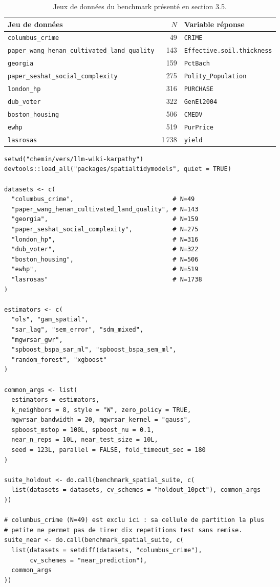 \documentclass[11pt,a4paper]{article}
\begin{document}
\begin{table}[htbp]
\centering
\small
\begin{tabular}{lrl}
\toprule
Jeu de données & $N$ & Variable réponse \\
\midrule
\texttt{columbus\_crime} & 49 & \texttt{CRIME} \\
\texttt{paper\_wang\_henan\_cultivated\_land\_quality} & 143 & \texttt{Effective.soil.thickness} \\
\texttt{georgia} & 159 & \texttt{PctBach} \\
\texttt{paper\_seshat\_social\_complexity} & 275 & \texttt{Polity\_Population} \\
\texttt{london\_hp} & 316 & \texttt{PURCHASE} \\
\texttt{dub\_voter} & 322 & \texttt{GenEl2004} \\
\texttt{boston\_housing} & 506 & \texttt{CMEDV} \\
\texttt{ewhp} & 519 & \texttt{PurPrice} \\
\texttt{lasrosas} & 1\,738 & \texttt{yield} \\
\bottomrule
\end{tabular}
\caption{Jeux de données du benchmark présenté en section 3.5.}
\label{tab:jeux-benchmark}
\end{table}

{\footnotesize
\begin{verbatim}
setwd("chemin/vers/llm-wiki-karpathy")
devtools::load_all("packages/spatialtidymodels", quiet = TRUE)

datasets <- c(
  "columbus_crime",                           # N=49
  "paper_wang_henan_cultivated_land_quality", # N=143
  "georgia",                                  # N=159
  "paper_seshat_social_complexity",           # N=275
  "london_hp",                                # N=316
  "dub_voter",                                # N=322
  "boston_housing",                           # N=506
  "ewhp",                                     # N=519
  "lasrosas"                                  # N=1738
)

estimators <- c(
  "ols", "gam_spatial",
  "sar_lag", "sem_error", "sdm_mixed",
  "mgwrsar_gwr",
  "spboost_bspa_sar_ml", "spboost_bspa_sem_ml",
  "random_forest", "xgboost"
)

common_args <- list(
  estimators = estimators,
  k_neighbors = 8, style = "W", zero_policy = TRUE,
  mgwrsar_bandwidth = 20, mgwrsar_kernel = "gauss",
  spboost_mstop = 100L, spboost_nu = 0.1,
  near_n_reps = 10L, near_test_size = 10L,
  seed = 123L, parallel = FALSE, fold_timeout_sec = 180
)

suite_holdout <- do.call(benchmark_spatial_suite, c(
  list(datasets = datasets, cv_schemes = "holdout_10pct"), common_args
))

# columbus_crime (N=49) est exclu ici : sa cellule de partition la plus
# petite ne permet pas de tirer dix repetitions test sans remise.
suite_near <- do.call(benchmark_spatial_suite, c(
  list(datasets = setdiff(datasets, "columbus_crime"),
       cv_schemes = "near_prediction"),
  common_args
))
\end{verbatim}
}
\end{document}
